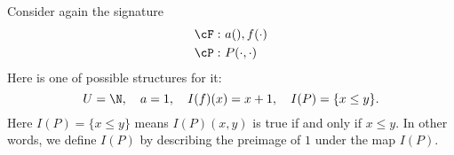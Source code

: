 

\setcounter{section}{1}
\setcounter{subsection}{4}
\setcounter{dfn}{11}

\begin{exl}
Consider again the signature
\begin{align*}
\cF:\ &a(), f(\cdot) \\
\cP:\ &P(\cdot, \cdot)
\end{align*}
Here is one of possible structures for it:
\[
U = \N, \quad a = 1, \quad I(f)(x) = x+1, \quad I(P) = \{x \le y\}.
\]
Here $I(P) = \{x \le y\}$ means $I(P)(x,y)$ is true if and only if $x \le y$.
In other words, we define $I(P)$ by describing the preimage of $1$ under the map $I(P)$.
\end{exl}



